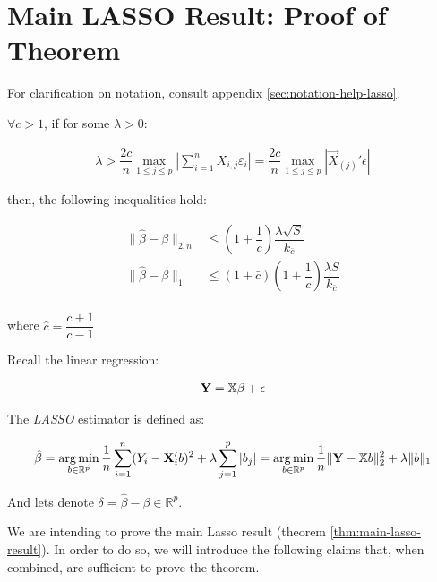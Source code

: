 \section{
    Main LASSO Result: Proof of Theorem 
}

For clarification on notation, consult appendix \ref{sec:notation-help-lasso}.

\begin{theorem}
\label{thm:main-lasso-result}
$\forall c > 1$, if for some $\lambda > 0$:

\begin{align*}
\lambda > \dfrac{2c}{n}
\max_{1 \leq j \leq p} \left|
    \sum_{i=1}^{n}X_{i,j} \varepsilon_i
\right|
= 
\dfrac{2c}{n}
\max_{1 \leq j \leq p} \left|
    \Vec{X}_{(j)}' \epsilon
\right|
\end{align*}

then, the following inequalities hold:

\begin{align*}
\|\hat{\beta} - \beta\|_{2, n}
&\leq 
\left(1 + \dfrac{1}{c}\right)
\dfrac{\lambda \sqrt{S}}{k_{\bar{c}}}\\
\|\hat{\beta} - \beta\|_{1}
&\leq 
\left(1 + \bar{c}\right) \left(1 + \dfrac{1}{c}\right)
\dfrac{\lambda S}{k_{\bar{c}}}\\
\end{align*}

where $\hat{c} = \dfrac{c+1}{c-1}$
\end{theorem}

Recall the linear regression:

\begin{align}
    \mathbf{Y} = \mathbb{X} \beta + \epsilon
    \label{eq:linear-regression}
\end{align}

The \emph{LASSO} estimator is defined as:

\begin{align}
\hat{\beta} 
=  \operatorname*{arg\,min}_{b \in \mathbb{R}^p} 
    \dfrac{1}{n} \sum_{i=1}^{n} (Y_i - \mathbf{X}_i' b)^2
    + \lambda \sum_{j=1}^{p} |b_j|
= \operatorname*{arg\,min}_{b \in \mathbb{R}^p} 
    \dfrac{1}{n} \|\mathbf{Y} - \mathbb{X} b\|_{2}^{2}
    + \lambda \|b\|_{1}
\label{eq:lasso-estimator}
\end{align}

And lets denote $\delta = \hat{\beta} - \beta \in \mathbb{R}^p$.

We are intending to prove the main Lasso result (theorem \ref{thm:main-lasso-result}). In order to do so, we will introduce the following claims that, when combined, are sufficient to prove the theorem.

